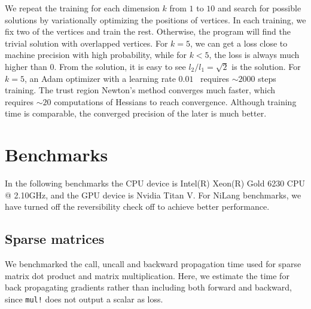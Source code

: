 \documentclass{article}
\newcommand{\<}{\langle}
\renewcommand{\>}{\rangle}
\newcommand{\ra}[1]{\renewcommand{\arraystretch}{#1}}
\theoremstyle{definition}\newtheorem{definition}{\textit{Definition}}
\begin{document}
We repeat the training for each dimension $k$ from $1$ to $10$ and search for possible solutions by variationally optimizing the positions of vertices.
In each training, we fix two of the vertices and train the rest. Otherwise, the program will find the trivial solution with overlapped vertices. 
For $k=5$, we can get a loss close to machine precision with high probability, while for $k < 5$, the loss is always much higher than $0$.
From the solution, it is easy to see $l_2/l_1 = \sqrt{2}$ is the solution.
For $k=5$, an Adam optimizer with a learning rate $0.01$~\cite{Kingma2014} requires $\sim2000$ steps training.
The trust region Newton's method converges much faster, which requires $\sim 20$ computations of Hessians to reach convergence.
Although training time is comparable, the converged precision of the later is much better.

\section{Benchmarks}\label{sec:benchmark}

In the following benchmarks the CPU device is Intel(R) Xeon(R) Gold 6230 CPU @ 2.10GHz, and the GPU device is Nvidia Titan V.
For NiLang benchmarks, we have turned off the reversibility check off to achieve better performance.

\subsection{Sparse matrices}\label{sec:benchsparse}
We benchmarked the call, uncall and backward propagation time used for sparse matrix dot product and matrix multiplication.
Here, we estimate the time for back propagating gradients rather than including both forward and backward, since \texttt{mul!} does not output a scalar as loss.

\begin{table}[h!]\centering
\begin{minipage}{0.8\columnwidth}
\ra{1.3}
    \caption{Absolute runtimes in seconds for computing the objectives (O) and the backward pass (B) of sparse matrix operations. The matrix size is $1000 \times 1000$, and the element density is $0.05$. The total time used in computing gradient can be estimated as a sum of ``O'' and ``B''.
    }\label{tbl:sparse}
\end{minipage}
\end{table}
\end{document}
